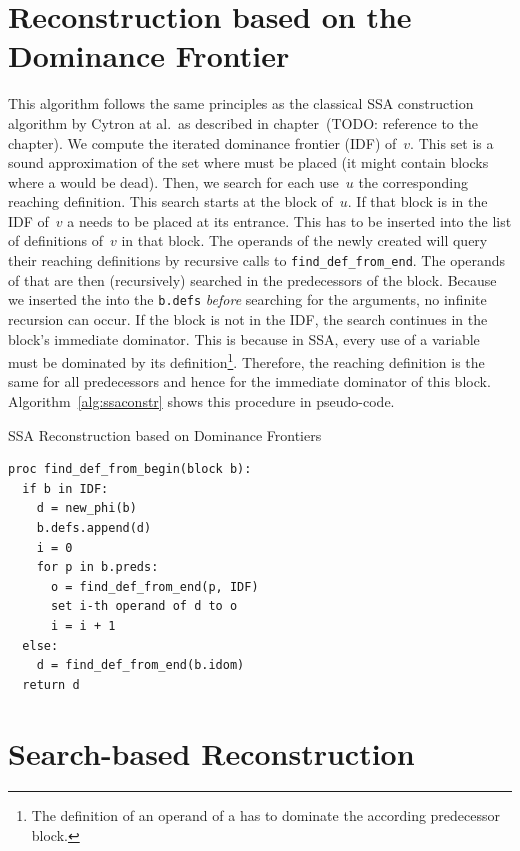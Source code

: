 \section{Reconstruction based on the Dominance Frontier}
This algorithm follows the same principles as the classical SSA construction algorithm by Cytron at al.~as described in chapter~(TODO: reference to the chapter).
We compute the iterated dominance frontier (IDF) of~$v$.
This set is a sound approximation of the set where \phifuns must be placed (it might contain blocks where a \phifun would be dead).
Then, we search for each use~$u$ the corresponding reaching definition.
This search starts at the block of~$u$.
If that block is in the IDF of~$v$ a \phifun needs to be placed at its entrance.
This \phifun has to be inserted into the list of definitions of~$v$ in that block.
The operands of the newly created \phifun will query their reaching definitions by recursive calls to \verb|find_def_from_end|.
The operands of that \phifun are then (recursively) searched in the predecessors of the block.
Because we inserted the \phifun into the \verb|b.defs| \emph{before} searching for the arguments, no infinite recursion can occur.
If the block is not in the IDF, the search continues in the block's immediate dominator. 
This is because in SSA, every use of a variable must be dominated by its definition\footnote{The definition of an operand of a \phifun has to dominate the according predecessor block.}.
Therefore, the reaching definition is the same for all predecessors and hence for the immediate dominator of this block.
Algorithm~\ref{alg:ssaconstr} shows this procedure in pseudo-code.

\begin{algorithm}
  \caption{SSA Reconstruction based on Dominance Frontiers}
  \label{alg:ssaconstr}
\begin{verbatim}
proc find_def_from_begin(block b):
  if b in IDF:
    d = new_phi(b)
    b.defs.append(d)
    i = 0
    for p in b.preds: 
      o = find_def_from_end(p, IDF)
      set i-th operand of d to o
      i = i + 1
  else:
    d = find_def_from_end(b.idom)
  return d
\end{verbatim}
\end{algorithm}

\section{Search-based Reconstruction}

